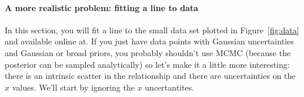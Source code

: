 \documentclass[letterpaper,12pt,preprint]{hack_aastex}
\begin{document}




\paragraph{A more realistic problem: fitting a line to data}

In this section, you will fit a line to the small data set plotted in
Figure~\ref{fig:data} and available online at.
If you just have data points with Gaussian uncertainties and Gaussian or broad
priors, you probably shouldn't use MCMC (because the posterior can be sampled
analytically) so let's make it a little more interesting: there is an
intrinsic scatter in the relationship and there are uncertainties on the $x$
values.
We'll start by ignoring the $x$ uncertantites.




\end{document}
